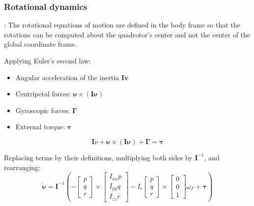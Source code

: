 \subsubsection{Rotational dynamics}:
The rotational equations of motion are defined in the body frame so that the rotations can be computed about the quadrotor’s center and not the center of the global coordinate frame.

Applying Euler's second law:
\begin{itemize}
  \item Angular acceleration of the inertia $\boldsymbol{I\dot{v}}$
  \item Centripetal forces: $\boldsymbol{\nu}\times(\boldsymbol{I \nu})$
  \item Gyroscopic forces: $\boldsymbol{\Gamma}$
  \item External torque: $\boldsymbol{\tau}$
\end{itemize}
$$\boldsymbol{I} \dot{\nu}+\boldsymbol{\nu} \times(\boldsymbol{I} \boldsymbol{\nu})+\mathbf{\Gamma}=\boldsymbol{\tau}$$

Replacing terms by their definitions, multiplying both sides by $\boldsymbol{I}^{-1}$, and rearranging:
$$\boldsymbol{\dot{\nu}}=\boldsymbol{I}^{-1}\left(-\left[ \begin{array}{c}{p} \\ {q} \\ {r}\end{array}\right] \times \left[ \begin{array}{c}{I_{x x} p} \\ {I_{y y} q} \\ {I_{z z} r}\end{array}\right]-I_{r} \left[ \begin{array}{c}{p} \\ {q} \\ {r}\end{array}\right] \times \left[ \begin{array}{c}{0} \\ {0} \\ {1}\end{array}\right] \omega_{\Gamma}+\boldsymbol{\tau}\right)$$

